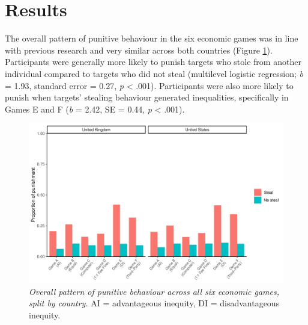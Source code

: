 \documentclass[
  man,floatsintext]{apa6}
\newenvironment{lltable}{\begin{landscape}\centering\begin{ThreePartTable}}{\end{ThreePartTable}\end{landscape}}
\begin{document}
\begin{lltable}
{\begin{longtable}{p{1.7cm}p{3.3cm}cccccccccccc}
\bottomrule
\end{longtable}

}

\end{lltable}

\hypertarget{results}{%
\section{Results}\label{results}}

The overall pattern of punitive behaviour in the six economic games was in line
with previous research and very similar across both countries (Figure
\ref{fig:plotDecisions}). Participants were generally more likely to punish
targets who stole from another individual compared to targets who did not steal
(multilevel logistic regression; \emph{b} =
1.93, standard error =
0.27, \emph{p}
\textless{} .001). Participants were also more likely
to punish when targets' stealing behaviour generated inequalities,
specifically in Games E and F (\emph{b} =
2.42, SE = 0.44,
\emph{p} \textless{} .001).





\begin{figure}
\centering
\includegraphics{manuscript_files/figure-latex/plotDecisions-1.pdf}
\caption{\label{fig:plotDecisions}\emph{Overall pattern of punitive behaviour across all six
economic games, split by country.} AI = advantageous inequity, DI =
disadvantageous inequity.}
\end{figure}
\end{document}
